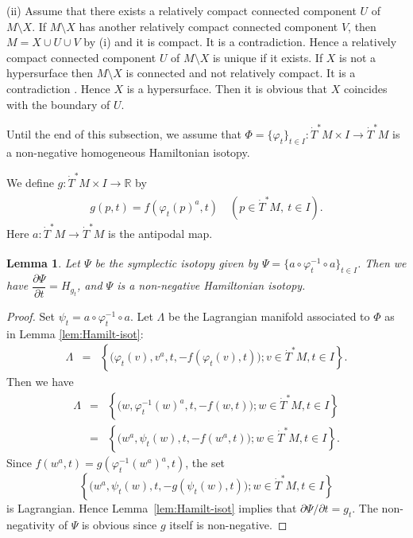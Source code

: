 \documentclass[12pt,leqno]{article}
\newtheorem{lemma}[theorem]{Lemma}
\theoremstyle{definition}
\newcommand{\R}{{\mathbb{R}}}
\def\phi{{\varphi}}
\renewcommand{\to}[1][]{\xrightarrow[]{#1}}
\newcommand{\opb}[1]{#1^{-1}}
\newcommand{\cl}{\colon}
\newcommand{\bl}{\bigl(}
\newcommand{\br}{\bigr)}
\newcommand{\eq}{\begin{eqnarray}}
\newcommand{\eneq}{\end{eqnarray}}
\newcommand{\eqn}{\begin{eqnarray*}}
\newcommand{\eneqn}{\end{eqnarray*}}
\newcommand{\set}[2]{\left\{#1 \mathbin{;} #2 \right\}}
\newcommand{\dT}{{\dot{T}}}
\newcommand{\dTM}{{\dT}^*M}
\numberwithin{equation}{section}
\begin{document}
\noindent
(ii)\quad 
Assume that there exists a relatively compact connected component $U$
of $M\setminus X$. If $M\setminus X$ has another
relatively compact connected component $V$, then $M=X\cup U\cup V$ 
by (i) and it is compact. It is a contradiction.
Hence  a relatively compact connected component $U$
of $M\setminus X$ is unique if it exists.
If $X$ is not a hypersurface then $M\setminus X$ is connected and not
relatively compact. It is a contradiction . Hence $X$ is a hypersurface.
Then it is obvious that $X$ coincides with the boundary of $U$.
\QED

Until the end of this subsection, we assume
that $\Phi=\{\phi_t\}_{t\in I}\cl\dT^*M\times I\to\dT^*M$ is
a non-negative homogeneous Hamiltonian isotopy.

We define $g\cl\dTM\times I\to \R$
by
\eq\label{eq:inv-opp-isot}
g(p,t) = f(\phi_t(p)^a, t)\quad (p\in\dT^*M,\ t\in I).
\eneq
Here $a\cl \dTM\to \dTM$ is the antipodal map.

\begin{lemma}\label{lem:inv-opp-isot}
Let $\Psi$ be the symplectic isotopy given by
$\Psi=\{a\circ \opb{\phi_t} \circ a\}_{t\in I}$.
Then we have $\dfrac{\partial\Psi}{\partial t}=H_{g_t}$,
and $\Psi$ is a non-negative Hamiltonian isotopy.
\end{lemma}
\begin{proof}
Set $\psi_t=a\circ \opb{\phi_t}\circ a$.
Let $\Lambda$ be the Lagrangian manifold associated to $\Phi$ as in 
Lemma \ref{lem:Hamilt-isot}:
\eqn
\Lambda & = &
\set{\bl\phi_t(v), v^a, t, -f(\phi_t(v),t)\br}{ v\in\dT^*M, t\in I}.
\eneqn
Then we have
\eqn
\Lambda & = &
\set{\bl w,  \phi_t^{-1}(w)^a, t, -f(w,t)\br}{ w\in\dT^*M, t\in I}\\
&=&
\set{\bl w^a,  \psi_t(w), t, -f(w^a,t)\br}{ w\in\dT^*M, t\in I}.
\eneqn
Since $f(w^a,t)=g(\phi_t^{-1}(w^a)^a,t)$, the set
$$\set{\bl w^a, \psi_t(w), t, -g(\psi_t(w),t)\br}{ w\in\dT^*M, t\in I}$$
is Lagrangian.
Hence Lemma~\ref{lem:Hamilt-isot} implies that
$\partial\Psi/\partial t=g_t$.
The non-negativity of $\Psi$ is obvious since $g$ itself is non-negative. 
\end{proof}
\end{document}
